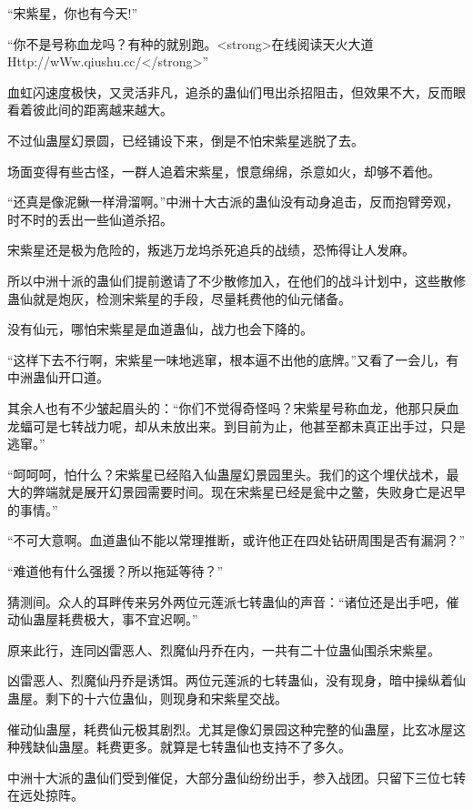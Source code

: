 
\begin{this_body}

“宋紫星，你也有今天!”

“你不是号称血龙吗？有种的就别跑。<strong>在线阅读天火大道Http://wWw.qiushu.cc/</strong>”

血虹闪速度极快，又灵活非凡，追杀的蛊仙们甩出杀招阻击，但效果不大，反而眼看着彼此间的距离越来越大。

不过仙蛊屋幻景圆，已经铺设下来，倒是不怕宋紫星逃脱了去。

场面变得有些古怪，一群人追着宋紫星，恨意绵绵，杀意如火，却够不着他。

“还真是像泥鳅一样滑溜啊。”中洲十大古派的蛊仙没有动身追击，反而抱臂旁观，时不时的丢出一些仙道杀招。

宋紫星还是极为危险的，叛逃万龙坞杀死追兵的战绩，恐怖得让人发麻。

所以中洲十派的蛊仙们提前邀请了不少散修加入，在他们的战斗计划中，这些散修蛊仙就是炮灰，检测宋紫星的手段，尽量耗费他的仙元储备。

没有仙元，哪怕宋紫星是血道蛊仙，战力也会下降的。

“这样下去不行啊，宋紫星一味地逃窜，根本逼不出他的底牌。”又看了一会儿，有中洲蛊仙开口道。

其余人也有不少皱起眉头的：“你们不觉得奇怪吗？宋紫星号称血龙，他那只戾血龙蝠可是七转战力呢，却从未放出来。到目前为止，他甚至都未真正出手过，只是逃窜。”

“呵呵呵，怕什么？宋紫星已经陷入仙蛊屋幻景园里头。我们的这个埋伏战术，最大的弊端就是展开幻景园需要时间。现在宋紫星已经是瓮中之鳖，失败身亡是迟早的事情。”

“不可大意啊。血道蛊仙不能以常理推断，或许他正在四处钻研周围是否有漏洞？”

“难道他有什么强援？所以拖延等待？”

猜测间。众人的耳畔传来另外两位元莲派七转蛊仙的声音：“诸位还是出手吧，催动仙蛊屋耗费极大，事不宜迟啊。”

原来此行，连同凶雷恶人、烈魔仙丹乔在内，一共有二十位蛊仙围杀宋紫星。

凶雷恶人、烈魔仙丹乔是诱饵。两位元莲派的七转蛊仙，没有现身，暗中操纵着仙蛊屋。剩下的十六位蛊仙，则现身和宋紫星交战。

催动仙蛊屋，耗费仙元极其剧烈。尤其是像幻景园这种完整的仙蛊屋，比玄冰屋这种残缺仙蛊屋。耗费更多。就算是七转蛊仙也支持不了多久。

中洲十大派的蛊仙们受到催促，大部分蛊仙纷纷出手，参入战团。只留下三位七转在远处掠阵。


\end{this_body}

